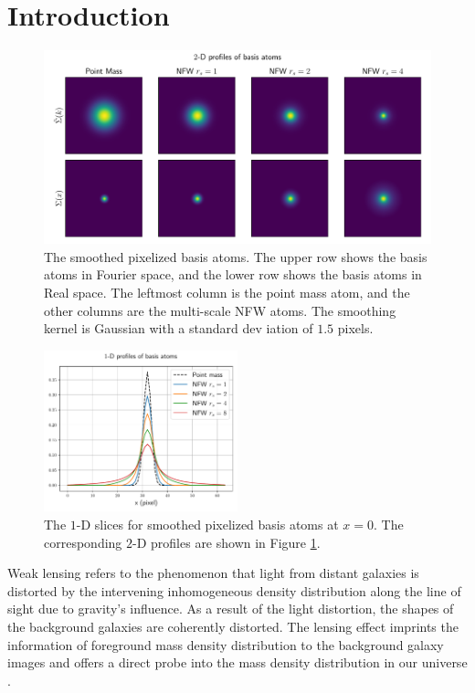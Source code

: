 \documentclass[twocolumn]{aastex62}
\begin{document}
\section{Introduction}

\begin{figure}[!t] \includegraphics[width=1.\textwidth]{nfwlet-atom-2D.pdf}
    \caption{The smoothed pixelized basis atoms. The upper row shows the basis
        atoms in Fourier space, and the lower row shows the basis atoms in Real
        space.  The leftmost column is the point mass atom, and the other
        columns are the multi-scale NFW atoms.  The smoothing kernel is
        Gaussian with a standard dev
        iation of $1.5$ pixels.
        } \label{fig_atoms2D}
\end{figure}

\begin{figure}
 \includegraphics[width=0.5\textwidth]{nfwlet-atom-1D.pdf}
    \caption{The $1$-D slices for smoothed pixelized basis atoms at $x=0$. The
        corresponding $2$-D profiles are shown in Figure \ref{fig_atoms2D}.
        }
 \label{fig_atoms1D}
\end{figure}

Weak lensing refers to the phenomenon that light from distant galaxies is
distorted by the intervening inhomogeneous density distribution along the line
of sight due to gravity's influence.
As a result of the light distortion, the shapes of the background galaxies are
coherently distorted. The lensing effect imprints the information of
foreground mass density distribution to the background galaxy images and offers
a direct probe into the mass density distribution in our universe
\citep[see][for recent reviews]{revKilbinger15,revRachel17}.
\end{document}
